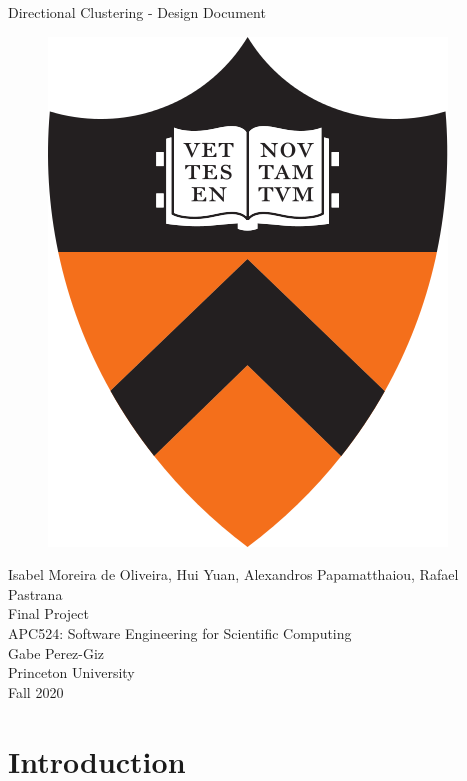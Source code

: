 \documentclass[11pt]{article}
\title{}
\author{}
\date{} %
\begin{document}
\begin{titlepage}
\centering
\vspace*{0mm}
\Large{Directional Clustering -  Design Document}
\vspace{30mm}

\begin{figure}[H]
\centering
\includegraphics[scale=0.2]{pton (1).png}
\end{figure}
\vspace{30mm}
\Large{Isabel Moreira de Oliveira, Hui Yuan, Alexandros Papamatthaiou, Rafael Pastrana}\\

\vspace{8mm}
\large{Final Project  \\ APC524: Software Engineering for Scientific Computing \\ }
\large{Gabe Perez-Giz}\\
\large{Princeton University \\Fall 2020\\}

\end{titlepage}


\section{Introduction}
\end{document}
